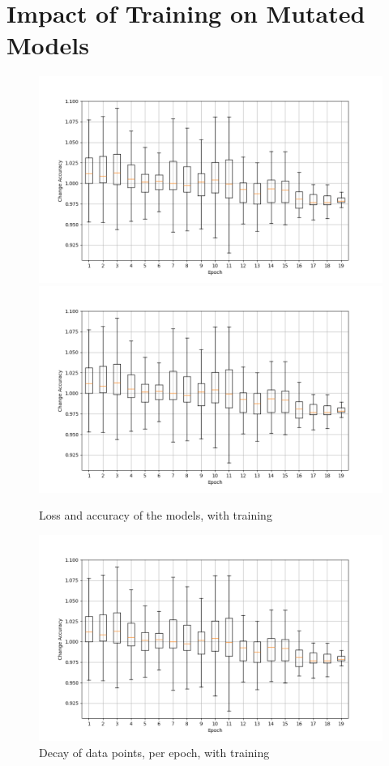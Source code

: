 \section{Impact of Training on Mutated Models}\label{sec:impact-of-training-on-mutated-models}
\begin{figure}
    \centering
    \includegraphics[width=\textwidth]{plots/Trained_Change_Acc.png}
    \includegraphics[width=\textwidth]{plots/Trained_Change_Loss.png}
    \caption{Loss and accuracy of the models, with training}
    \label{fig:loss-accuracy-training}
\end{figure}
\begin{figure}
    \centering
    \includegraphics[width=\textwidth]{plots/Trained_Points_perEpoch.png}
    \caption{Decay of data points, per epoch, with training}
    \label{fig:decay_training}
\end{figure}
